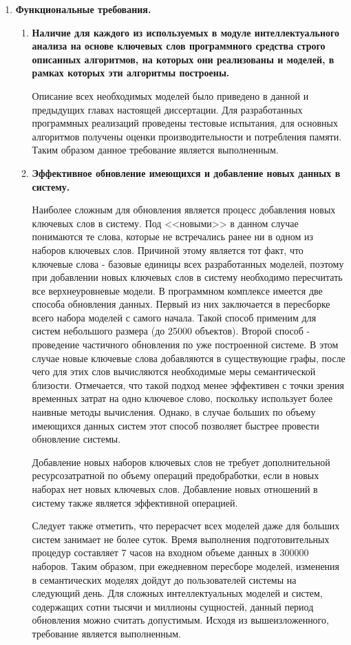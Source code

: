 \begin{enumerate}
    \item \textbf{Функциональные требования.}
    \begin{enumerate}[label*=\arabic*.]
        \item \textbf{Наличие для каждого из используемых в модуле интеллектуального анализа на основе ключевых слов программного средства строго описанных алгоритмов, на которых они реализованы и моделей, в рамках которых эти алгоритмы построены.}

            Описание всех необходимых моделей было приведено в данной и предыдущих главах настоящей диссертации. Для разработанных программных реализаций проведены тестовые испытания, для основных алгоритмов получены оценки производительности и потребления памяти. Таким образом данное требование является выполненным.
        \item \textbf{Эффективное обновление имеющихся и добавление новых данных в систему.}

            Наиболее сложным для обновления является процесс добавления новых ключевых слов в систему. Под <<новыми>> в данном случае понимаются те слова, которые не встречались ранее ни в одном из наборов ключевых слов. Причиной этому является тот факт, что ключевые слова - базовые единицы всех разработанных моделей, поэтому при добавлении новых ключевых слов в систему необходимо пересчитать все верхнеуровневые модели. В программном комплексе имеется две способа обновления данных. Первый из них заключается в пересборке всего набора моделей с самого начала. Такой способ применим для систем небольшого размера (до 25000 объектов). Второй способ - проведение частичного обновления по уже построенной системе. В этом случае новые ключевые слова добавляются в существующие графы, после чего для этих слов вычисляются необходимые меры семантической близости. Отмечается, что такой подход менее эффективен с точки зрения временных затрат на одно ключевое слово, поскольку использует более наивные методы вычисления. Однако, в случае больших по объему имеющихся данных систем этот способ позволяет быстрее провести обновление системы. 

            Добавление новых наборов ключевых слов не требует дополнительной ресурсозатратной по объему операций предобработки, если в новых наборах нет новых ключевых слов. Добавление новых отношений в систему также является эффективной операцией.
            
            Следует также отметить, что перерасчет всех моделей даже для больших систем занимает не более суток. Время выполнения подготовительных процедур составляет 7 часов на входном объеме данных в 300000 наборов. Таким образом, при ежедневном пересборе моделей, изменения в семантических моделях дойдут до пользователей системы на следующий день. Для сложных интеллектуальных моделей и систем, содержащих сотни тысячи и миллионы сущностей, данный период обновления можно считать допустимым. Исходя из вышеизложенного, требование является выполненным.


\end{enumerate}
\end{enumerate}
